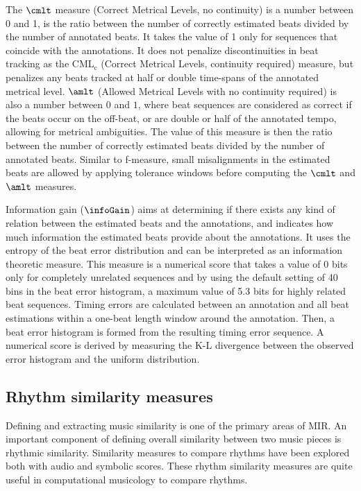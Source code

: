 The $\cmlt$ measure (Correct Metrical Levels, no continuity) is a number between 0 and 1, is the ratio between the number of correctly estimated beats divided by the number of annotated beats. It takes the value of 1 only for sequences that coincide with the annotations. It does not penalize discontinuities in beat tracking as the CML$_\mathrm{c}$ (Correct Metrical Levels, continuity required) measure, but penalizes any beats tracked at half or double time-spans of the annotated metrical level. $\amlt$ (Allowed Metrical Levels with no continuity required) is also a number between $0$ and $1$, where beat sequences are considered as correct if the beats occur on the off-beat, or are double or half of the annotated tempo, allowing for metrical ambiguities. The value of this measure is then the ratio between the number of correctly estimated beats divided by the number of annotated beats. Similar to f-measure, small misalignments in the estimated beats are allowed by applying tolerance windows before computing the $\cmlt$ and $\amlt$ measures.

Information gain ($\infoGain$) aims at determining if there exists any kind of relation between the estimated beats and the annotations, and indicates how much information the estimated beats provide about the annotations. It uses the entropy of the beat error distribution and can be interpreted as an information theoretic measure. This measure is a numerical score that takes a value of 0 bits only for completely unrelated sequences and by using the default setting of 40 bins in the beat error histogram, a maximum value of 5.3 bits for highly related beat sequences. Timing errors are calculated between an annotation and all beat estimations within a one-beat length window around the annotation. Then, a beat error histogram is formed from the resulting timing error sequence. A numerical score is derived by measuring the K-L divergence between the observed error histogram and the uniform distribution. 
\subsection{Rhythm similarity measures}\label{sec:bkgnd:rhythmsim}
Defining and extracting music similarity is one of the primary areas of \gls{MIR}. An important component of defining overall similarity between two music pieces is rhythmic similarity. Similarity measures to compare rhythms have been explored both with audio and symbolic scores. These rhythm similarity measures are quite useful in computational musicology to compare rhythms. 


